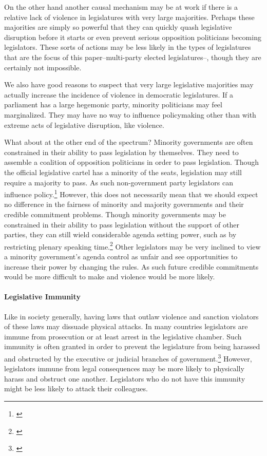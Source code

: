 \documentclass[a4paper]{article}\usepackage[]{graphicx}\usepackage[]{color}
\begin{document}
On the other hand another causal mechanism may be at work if there is a relative lack of violence in legislatures with very large majorities. Perhaps these majorities are simply so powerful that they can quickly quash legislative disruption before it starts or even prevent serious opposition politicians becoming legislators. These sorts of actions may be less likely in the types of legislatures that are the focus of this paper--multi-party elected legislatures--, though they are certainly not impossible. 

We also have good reasons to suspect that very large legislative majorities may actually increase the incidence of violence in democratic legislatures. If a parliament has a large hegemonic party, minority politicians may feel marginalized. They may have no way to influence policymaking other than with extreme acts of legislative disruption, like violence.

What about at the other end of the spectrum? Minority governments are often constrained in their ability to pass legislation by themselves. They need to assemble a coalition of opposition politicians in order to pass legislation. Though the official legislative cartel has a minority of the seats, legislation may still require a majority to pass. As such non-government party legislators can influence policy.\footnote{\citealt{strom1990minority}} However, this does not necessarily mean that we should expect no difference in the fairness of minority and majority governments and their credible commitment problems. Though minority governments may be constrained in their ability to pass legislation without the support of other parties, they can still wield considerable agenda setting power, such as by restricting plenary speaking time.\footnote{\citealt{Tsebelis2002,cox2005,cox2007}} Other legislators may be very inclined to view a minority government's agenda control as unfair and see opportunities to increase their power by changing the rules. As such future credible commitments would be more difficult to make and violence would be more likely. 

\paragraph{Legislative Immunity}

Like in society generally, having laws that outlaw violence and sanction violators of these laws may dissuade physical attacks. In many countries legislators are immune from prosecution or at least arrest in the legislative chamber. Such immunity is often granted in order to prevent the legislature from being harassed and obstructed by the executive or judicial branches of government.\footnote{\citealt{Seghetti1984}} However, legislators immune from legal consequences may be more likely to physically harass and obstruct one another. Legislators who do not have this immunity might be less likely to attack their colleagues. 
\end{document}
